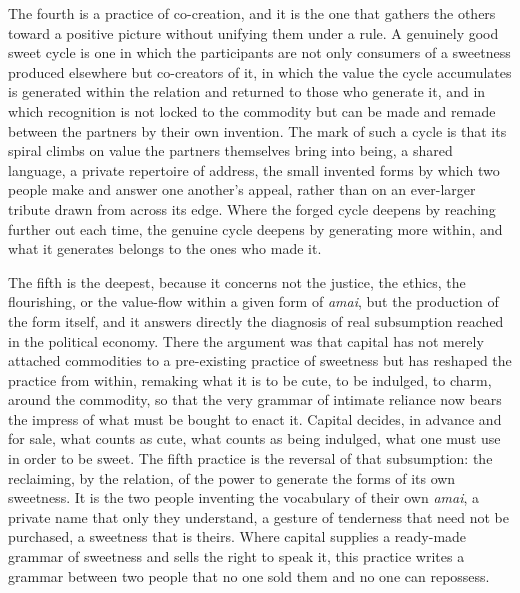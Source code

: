 The fourth is a practice of co-creation, and it is the one that gathers the others toward a positive picture without unifying them under a rule. A genuinely good sweet cycle is one in which the participants are not only consumers of a sweetness produced elsewhere but co-creators of it, in which the value the cycle accumulates is generated within the relation and returned to those who generate it, and in which recognition is not locked to the commodity but can be made and remade between the partners by their own invention. The mark of such a cycle is that its spiral climbs on value the partners themselves bring into being, a shared language, a private repertoire of address, the small invented forms by which two people make and answer one another's appeal, rather than on an ever-larger tribute drawn from across its edge. Where the forged cycle deepens by reaching further out each time, the genuine cycle deepens by generating more within, and what it generates belongs to the ones who made it.

The fifth is the deepest, because it concerns not the justice, the ethics, the flourishing, or the value-flow within a given form of \textit{amai}, but the production of the form itself, and it answers directly the diagnosis of real subsumption reached in the political economy. There the argument was that capital has not merely attached commodities to a pre-existing practice of sweetness but has reshaped the practice from within, remaking what it is to be cute, to be indulged, to charm, around the commodity, so that the very grammar of intimate reliance now bears the impress of what must be bought to enact it. Capital decides, in advance and for sale, what counts as cute, what counts as being indulged, what one must use in order to be sweet. The fifth practice is the reversal of that subsumption: the reclaiming, by the relation, of the power to generate the forms of its own sweetness. It is the two people inventing the vocabulary of their own \textit{amai}, a private name that only they understand, a gesture of tenderness that need not be purchased, a sweetness that is theirs. Where capital supplies a ready-made grammar of sweetness and sells the right to speak it, this practice writes a grammar between two people that no one sold them and no one can repossess.

